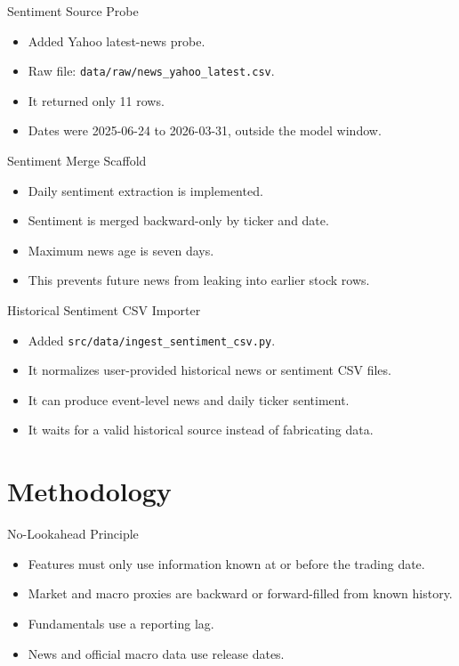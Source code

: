 \documentclass[aspectratio=43,10pt]{beamer}
\begin{document}
\begin{frame}{Sentiment Source Probe}
\begin{itemize}
  \item Added Yahoo latest-news probe.
  \item Raw file: \texttt{data/raw/news\_yahoo\_latest.csv}.
  \item It returned only 11 rows.
  \item Dates were 2025-06-24 to 2026-03-31, outside the model window.
\end{itemize}
\end{frame}

\begin{frame}{Sentiment Merge Scaffold}
\begin{itemize}
  \item Daily sentiment extraction is implemented.
  \item Sentiment is merged backward-only by ticker and date.
  \item Maximum news age is seven days.
  \item This prevents future news from leaking into earlier stock rows.
\end{itemize}
\end{frame}

\begin{frame}{Historical Sentiment CSV Importer}
\begin{itemize}
  \item Added \texttt{src/data/ingest\_sentiment\_csv.py}.
  \item It normalizes user-provided historical news or sentiment CSV files.
  \item It can produce event-level news and daily ticker sentiment.
  \item It waits for a valid historical source instead of fabricating data.
\end{itemize}
\end{frame}

\section{Methodology}

\begin{frame}{No-Lookahead Principle}
\begin{itemize}
  \item Features must only use information known at or before the trading date.
  \item Market and macro proxies are backward or forward-filled from known history.
  \item Fundamentals use a reporting lag.
  \item News and official macro data use release dates.
\end{itemize}
\end{frame}
\end{document}
